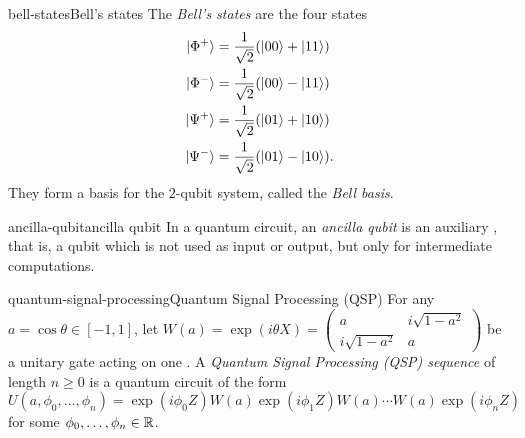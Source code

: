 \begin{topic}{bell-states}{Bell's states}
    The \emph{Bell's states} are the four  states
    \[ \begin{aligned}
        |\Phi^+\rangle &= \frac{1}{\sqrt{2}} (|00\rangle + |11\rangle) \\
        |\Phi^-\rangle &= \frac{1}{\sqrt{2}} (|00\rangle - |11\rangle) \\
        |\Psi^+\rangle &= \frac{1}{\sqrt{2}} (|01\rangle + |10\rangle) \\
        |\Psi^-\rangle &= \frac{1}{\sqrt{2}} (|01\rangle - |10\rangle) .
    \end{aligned} \]
    They form a basis for the $2$-qubit system, called the \textit{Bell basis}.
\end{topic}

\begin{topic}{ancilla-qubit}{ancilla qubit}
    In a quantum circuit, an \emph{ancilla qubit} is an auxiliary , that is, a qubit which is not used as input or output, but only for intermediate computations.
\end{topic}



\begin{topic}{quantum-signal-processing}{Quantum Signal Processing (QSP)}
    For any $a = \cos \theta \in [-1, 1]$, let $W(a) = \exp(i \theta X) = \begin{pmatrix} a & i \sqrt{1 - a^2} \\ i \sqrt{1 - a^2} & a \end{pmatrix}$ be a unitary gate acting on one .
    A \emph{Quantum Signal Processing (QSP) sequence} of length $n \ge 0$ is a quantum circuit of the form
    \[ U(a, \phi_0, \ldots, \phi_n) = \exp(i \phi_0 Z) W(a) \exp(i \phi_1 Z) W(a) \cdots W(a) \exp(i \phi_n Z) \]
    for some $\phi_0, \ldots, \phi_n \in \mathbb{R}$.
\end{topic}

